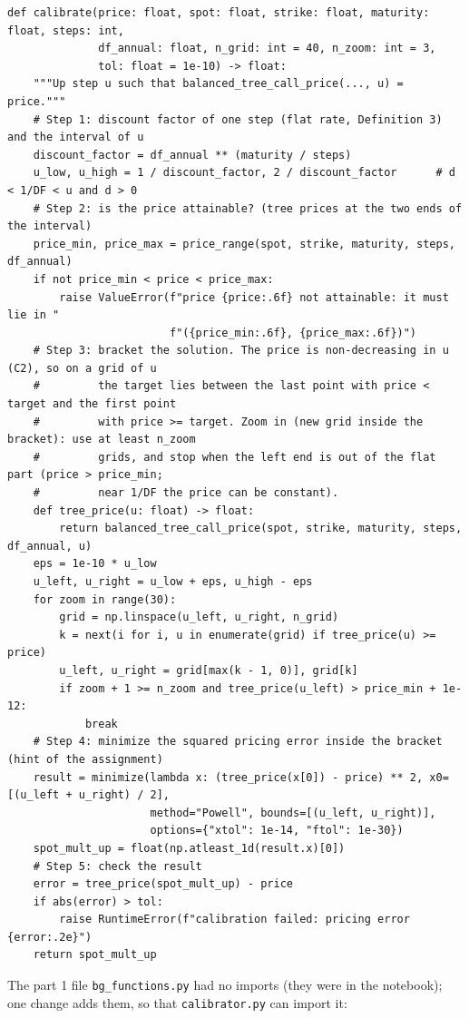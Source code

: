 \documentclass[11pt,a4paper]{article}
\begin{document}
\begin{minipage}{\linewidth}
\begin{lstlisting}[style=pysmall,title={new code (\texttt{calibrator.py})}]
def calibrate(price: float, spot: float, strike: float, maturity: float, steps: int,
              df_annual: float, n_grid: int = 40, n_zoom: int = 3,
              tol: float = 1e-10) -> float:
    """Up step u such that balanced_tree_call_price(..., u) = price."""
    # Step 1: discount factor of one step (flat rate, Definition 3) and the interval of u
    discount_factor = df_annual ** (maturity / steps)
    u_low, u_high = 1 / discount_factor, 2 / discount_factor      # d < 1/DF < u and d > 0
    # Step 2: is the price attainable? (tree prices at the two ends of the interval)
    price_min, price_max = price_range(spot, strike, maturity, steps, df_annual)
    if not price_min < price < price_max:
        raise ValueError(f"price {price:.6f} not attainable: it must lie in "
                         f"({price_min:.6f}, {price_max:.6f})")
    # Step 3: bracket the solution. The price is non-decreasing in u (C2), so on a grid of u
    #         the target lies between the last point with price < target and the first point
    #         with price >= target. Zoom in (new grid inside the bracket): use at least n_zoom
    #         grids, and stop when the left end is out of the flat part (price > price_min;
    #         near 1/DF the price can be constant).
    def tree_price(u: float) -> float:
        return balanced_tree_call_price(spot, strike, maturity, steps, df_annual, u)
    eps = 1e-10 * u_low
    u_left, u_right = u_low + eps, u_high - eps
    for zoom in range(30):
        grid = np.linspace(u_left, u_right, n_grid)
        k = next(i for i, u in enumerate(grid) if tree_price(u) >= price)
        u_left, u_right = grid[max(k - 1, 0)], grid[k]
        if zoom + 1 >= n_zoom and tree_price(u_left) > price_min + 1e-12:
            break
    # Step 4: minimize the squared pricing error inside the bracket (hint of the assignment)
    result = minimize(lambda x: (tree_price(x[0]) - price) ** 2, x0=[(u_left + u_right) / 2],
                      method="Powell", bounds=[(u_left, u_right)],
                      options={"xtol": 1e-14, "ftol": 1e-30})
    spot_mult_up = float(np.atleast_1d(result.x)[0])
    # Step 5: check the result
    error = tree_price(spot_mult_up) - price
    if abs(error) > tol:
        raise RuntimeError(f"calibration failed: pricing error {error:.2e}")
    return spot_mult_up
\end{lstlisting}\end{minipage}\par\smallskip
\noindent The part 1 file \texttt{bg\_functions.py} had no imports (they were in the notebook); one change adds them, so that \texttt{calibrator.py} can import it:
\end{document}

